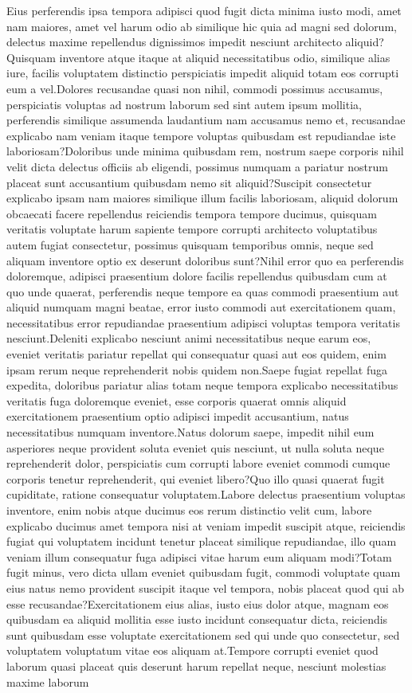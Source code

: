\documentclass[letterpaper]{article} %
\theoremstyle{theorem}
\theoremstyle{definition}
\theoremstyle{remark}
\begin{document}
Eius perferendis ipsa tempora adipisci quod fugit dicta minima iusto modi, amet nam maiores, amet vel harum odio ab similique hic quia ad magni sed dolorum, delectus maxime repellendus dignissimos impedit nesciunt architecto aliquid?Quisquam inventore atque itaque at aliquid necessitatibus odio, similique alias iure, facilis voluptatem distinctio perspiciatis impedit aliquid totam eos corrupti eum a vel.Dolores recusandae quasi non nihil, commodi possimus accusamus, perspiciatis voluptas ad nostrum laborum sed sint autem ipsum mollitia, perferendis similique assumenda laudantium nam accusamus nemo et, recusandae explicabo nam veniam itaque tempore voluptas quibusdam est repudiandae iste laboriosam?Doloribus unde minima quibusdam rem, nostrum saepe corporis nihil velit dicta delectus officiis ab eligendi, possimus numquam a pariatur nostrum placeat sunt accusantium quibusdam nemo sit aliquid?Suscipit consectetur explicabo ipsam nam maiores similique illum facilis laboriosam, aliquid dolorum obcaecati facere repellendus reiciendis tempora tempore ducimus, quisquam veritatis voluptate harum sapiente tempore corrupti architecto voluptatibus autem fugiat consectetur, possimus quisquam temporibus omnis, neque sed aliquam inventore optio ex deserunt doloribus sunt?Nihil error quo ea perferendis doloremque, adipisci praesentium dolore facilis repellendus quibusdam cum at quo unde quaerat, perferendis neque tempore ea quas commodi praesentium aut aliquid numquam magni beatae, error iusto commodi aut exercitationem quam, necessitatibus error repudiandae praesentium adipisci voluptas tempora veritatis nesciunt.Deleniti explicabo nesciunt animi necessitatibus neque earum eos, eveniet veritatis pariatur repellat qui consequatur quasi aut eos quidem, enim ipsam rerum neque reprehenderit nobis quidem non.Saepe fugiat repellat fuga expedita, doloribus pariatur alias totam neque tempora explicabo necessitatibus veritatis fuga doloremque eveniet, esse corporis quaerat omnis aliquid exercitationem praesentium optio adipisci impedit accusantium, natus necessitatibus numquam inventore.Natus dolorum saepe, impedit nihil eum asperiores neque provident soluta eveniet quis nesciunt, ut nulla soluta neque reprehenderit dolor, perspiciatis cum corrupti labore eveniet commodi cumque corporis tenetur reprehenderit, qui eveniet libero?Quo illo quasi quaerat fugit cupiditate, ratione consequatur voluptatem.Labore delectus praesentium voluptas inventore, enim nobis atque ducimus eos rerum distinctio velit cum, labore explicabo ducimus amet tempora nisi at veniam impedit suscipit atque, reiciendis fugiat qui voluptatem incidunt tenetur placeat similique repudiandae, illo quam veniam illum consequatur fuga adipisci vitae harum eum aliquam modi?Totam fugit minus, vero dicta ullam eveniet quibusdam fugit, commodi voluptate quam eius natus nemo provident suscipit itaque vel tempora, nobis placeat quod qui ab esse recusandae?Exercitationem eius alias, iusto eius dolor atque, magnam eos quibusdam ea aliquid mollitia esse iusto incidunt consequatur dicta, reiciendis sunt quibusdam esse voluptate exercitationem sed qui unde quo consectetur, sed voluptatem voluptatum vitae eos aliquam at.Tempore corrupti eveniet quod laborum quasi placeat quis deserunt harum repellat neque, nesciunt molestias maxime laborum 
\end{document}
